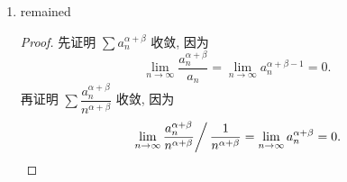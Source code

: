 \begin{enumerate}
\begin{proof}
            对第二个级数, 考虑其与 $\sum\dfrac{1}{n^2}$ 的比的极限形式. 则有
            \[
                \lim_{n\to\infty}\frac{1}{1 + \frac{1}{n^2a_n}},    
            \]
            不论此极限趋于 $0$ 还是有限数都可以表明 $\sum\dfrac{a_n}{1 + n^2a_n}$ 收敛.
        \end{proof}
    \item %
        {\color{red}remained}
        \begin{proof}
            先证明 $\sum{a_n^{\alpha+\beta}}$ 收敛, 因为
            \[
                \lim_{n\to\infty}\frac{a_n^{\alpha+\beta}}{a_n} = \lim_{n\to\infty}a_n^{\alpha+\beta-1} = 0.    
            \]
            再证明 $\sum\dfrac{a_n^{\alpha+\beta}}{n^{\alpha+\beta}}$ 收敛, 因为
            \[
                \left.\lim_{n\to\infty}\frac{a_n^{\alpha+\beta}}{n^{\alpha+\beta}} \right/ \frac{1}{n^{\alpha+\beta}} = \lim_{n\to\infty}a_n^{\alpha+\beta} = 0. \qedhere    
            \]
        \end{proof}
\end{enumerate}
% 
